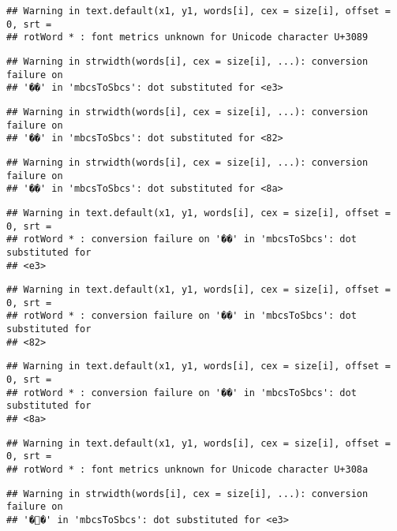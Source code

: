 \documentclass[]{article}
\begin{document}
\begin{verbatim}
## Warning in text.default(x1, y1, words[i], cex = size[i], offset = 0, srt =
## rotWord * : font metrics unknown for Unicode character U+3089
\end{verbatim}

\begin{verbatim}
## Warning in strwidth(words[i], cex = size[i], ...): conversion failure on
## '��' in 'mbcsToSbcs': dot substituted for <e3>
\end{verbatim}

\begin{verbatim}
## Warning in strwidth(words[i], cex = size[i], ...): conversion failure on
## '��' in 'mbcsToSbcs': dot substituted for <82>
\end{verbatim}

\begin{verbatim}
## Warning in strwidth(words[i], cex = size[i], ...): conversion failure on
## '��' in 'mbcsToSbcs': dot substituted for <8a>
\end{verbatim}

\begin{verbatim}
## Warning in text.default(x1, y1, words[i], cex = size[i], offset = 0, srt =
## rotWord * : conversion failure on '��' in 'mbcsToSbcs': dot substituted for
## <e3>
\end{verbatim}

\begin{verbatim}
## Warning in text.default(x1, y1, words[i], cex = size[i], offset = 0, srt =
## rotWord * : conversion failure on '��' in 'mbcsToSbcs': dot substituted for
## <82>
\end{verbatim}

\begin{verbatim}
## Warning in text.default(x1, y1, words[i], cex = size[i], offset = 0, srt =
## rotWord * : conversion failure on '��' in 'mbcsToSbcs': dot substituted for
## <8a>
\end{verbatim}

\begin{verbatim}
## Warning in text.default(x1, y1, words[i], cex = size[i], offset = 0, srt =
## rotWord * : font metrics unknown for Unicode character U+308a
\end{verbatim}

\begin{verbatim}
## Warning in strwidth(words[i], cex = size[i], ...): conversion failure on
## '��' in 'mbcsToSbcs': dot substituted for <e3>
\end{verbatim}
\end{document}
